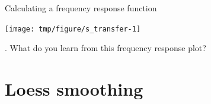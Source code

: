 \begin{frame}[fragile]{Calculating a frequency response function}
\begin{knitrout}\small
{}\color{fgcolor}\begin{kframe}
\begin{alltt}
\hlopt{$}\hlopt{$}\hlstd{spec[,}\hlstd{]}\hlopt{/}\hlopt{$}\hlstd{spec[,}\hlstd{],}\hlstd{=}\hlstd{,}\hlstd{=}\hlstd{,}
  \hlstd{=}\hlstd{,} \hlstd{=}\hlstd{,}
  \hlstd{=}\hlstd{)}
\hlstd{(}\hlstd{=}\hlstd{(}\hlstd{,}\hlstd{),}\hlstd{=}\hlstd{)}
\end{alltt}
\end{kframe}
\end{knitrout}



\end{frame}

\begin{frame}[fragile]

\begin{knitrout}\small
{}\color{fgcolor}

{\centering \texttt{[image: tmp/figure/s\_transfer-1]} 

}


\end{knitrout}

\vspace{-3mm}

\myquestion. What do you learn from this frequency response plot?


\end{frame}

\section{Loess smoothing}

